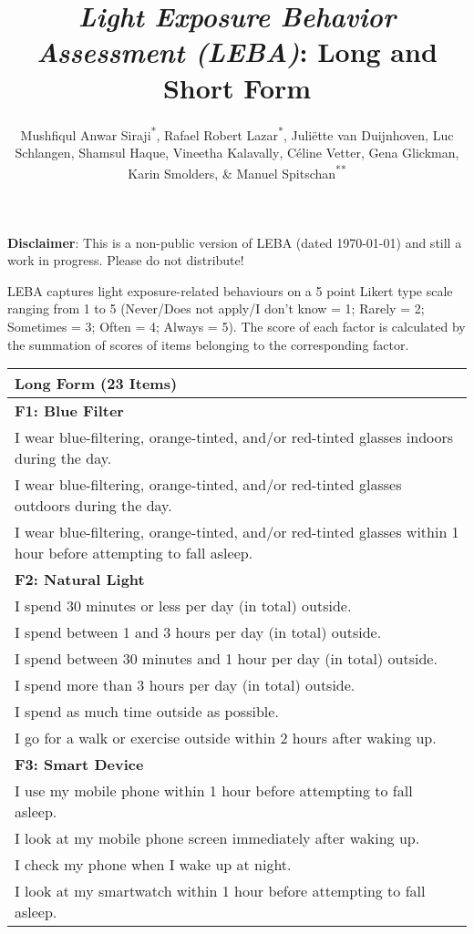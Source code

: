 \documentclass[
  english,
  man,floatsintext]{apa6}
\title{\emph{Light Exposure Behavior Assessment (LEBA)}: Long and Short Form}
\author{Mushfiqul Anwar Siraji\textsuperscript{*}, Rafael Robert Lazar\textsuperscript{*}, Juliëtte van Duijnhoven\textsuperscript{}, Luc Schlangen\textsuperscript{}, Shamsul Haque\textsuperscript{}, Vineetha Kalavally\textsuperscript{}, Céline Vetter\textsuperscript{}, Gena Glickman\textsuperscript{}, Karin Smolders\textsuperscript{}, \& Manuel Spitschan\textsuperscript{**}}
\date{}
\affiliation{\vspace{0.5cm}\textsuperscript{*} Joint first authors\\\textsuperscript{**} Corresponding author: \href{mailto:manuel.spitschan@psy.ox.ac.uk}{\nolinkurl{manuel.spitschan@psy.ox.ac.uk}}}
\begin{document}
\maketitle

\textbf{Disclaimer}: This is a non-public version of LEBA (dated \today) and still a work in progress. Please do not distribute!

LEBA captures light exposure-related behaviours on a 5 point Likert type scale ranging from 1 to 5 (Never/Does not apply/I don't know = 1; Rarely = 2; Sometimes = 3; Often = 4; Always = 5). The score of each factor is calculated by the summation of scores of items belonging to the corresponding factor.

\newpage

\begin{longtable}[]{@{}
  >{\raggedright\arraybackslash}p{}@{}}
\toprule
Long Form (23 Items) \\
\midrule
\endhead
\textbf{F1: Blue Filter} \\
I wear blue-filtering, orange-tinted, and/or red-tinted glasses indoors during the day. \\
I wear blue-filtering, orange-tinted, and/or red-tinted glasses outdoors during the day. \\
I wear blue-filtering, orange-tinted, and/or red-tinted glasses within 1 hour before attempting to fall asleep. \\
\textbf{F2: Natural Light} \\
I spend 30 minutes or less per day (in total) outside. \\
I spend between 1 and 3 hours per day (in total) outside. \\
I spend between 30 minutes and 1 hour per day (in total) outside. \\
I spend more than 3 hours per day (in total) outside. \\
I spend as much time outside as possible. \\
I go for a walk or exercise outside within 2 hours after waking up. \\
\textbf{F3: Smart Device} \\
I use my mobile phone within 1 hour before attempting to fall asleep. \\
I look at my mobile phone screen immediately after waking up. \\
I check my phone when I wake up at night. \\
I look at my smartwatch within 1 hour before attempting to fall asleep. \\

\end{longtable}
\end{document}
